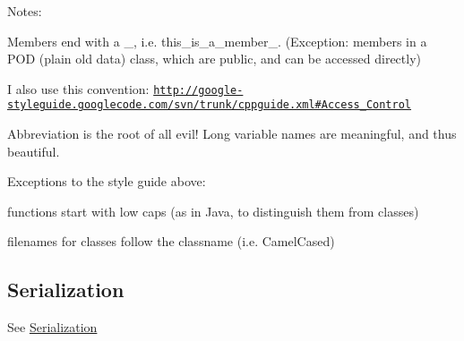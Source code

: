 Notes\+: \begin{DoxyItemize}
\item Members end with a \+\_\+, i.\+e. {\ttfamily this\+\_\+is\+\_\+a\+\_\+member\+\_\+}. (Exception\+: members in a P\+O\+D (plain old data) class, which are public, and can be accessed directly) \item I also use this convention\+: \href{http://google-styleguide.googlecode.com/svn/trunk/cppguide.xml#Access_Control}{\tt http\+://google-\/styleguide.\+googlecode.\+com/svn/trunk/cppguide.\+xml\#\+Access\+\_\+\+Control} \item Abbreviation is the root of all evil! Long variable names are meaningful, and thus beautiful.\end{DoxyItemize}
Exceptions to the style guide above\+: \begin{DoxyItemize}
\item functions start with low caps (as in Java, to distinguish them from classes) \item filenames for classes follow the classname (i.\+e. Camel\+Cased)\end{DoxyItemize}
\hypertarget{page_design_Serialization}{}\subsection{Serialization}\label{page_design_Serialization}
See \hyperlink{page_serialization}{Serialization} 